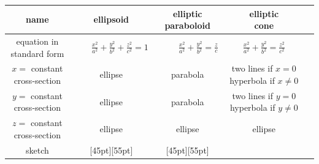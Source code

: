 \begin{tabular}{ | c | c | c | c | c |}
  \hline
  name & ellipsoid 
       & \parbox[c]{1.8cm}{\smallskip elliptic\\paraboloid}
       & \parbox[c]{1.5cm}{\smallskip elliptic\\cone}  \\[0.1in]
  \hline
  \parbox[c]{2.75cm}{\smallskip equation in\\standard form} 
       & \parbox[c]{3.4cm}{\ \ \ \ 
             $\frac{x^2}{a^2}+\frac{y^2}{b^2}+\frac{z^2}{c^2}=1$} 
       & \parbox[c]{3.4cm}{\ \ \ \ \ 
             $\frac{x^2}{a^2}+\frac{y^2}{b^2}=\frac{z}{c}$}
       & \parbox[c]{2.3cm}{
             $\frac{x^2}{a^2}+\frac{y^2}{b^2}=\frac{z^2}{c^2}$} \\[0.1in]
  \hline
  \parbox[c]{2.75cm}{\smallskip $x=$ constant \\cross-section} 
            & ellipse
            & parabola
            & \parbox[c]{3.5cm}{\smallskip two lines if $x=0$\\
                                           hyperbola if $x\ne 0$}   \\[0.1in]
  \hline
  \parbox[c]{2.75cm}{\smallskip $y=$ constant \\cross-section} 
            & ellipse
            & parabola
            & \parbox[c]{3.5cm}{\smallskip two lines if $y=0$\\
                                           hyperbola if $y\ne 0$} \\[0.1in]
  \hline
  \parbox[c]{2.75cm}{\smallskip $z=$ constant \\cross-section} 
            & ellipse
            & ellipse 
            & ellipse  \\[0.1in]
  \hline
  sketch 
     & \raisebox{-50pt}[45pt][55pt]
              {  }
     & \raisebox{-48pt}[45pt][55pt]
              {  }

\end{tabular}
